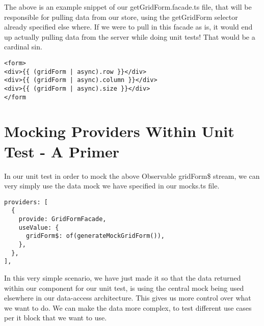 The above is an example snippet of our getGridForm.facade.ts file, that will be responsible for pulling data from our store, using the getGridForm selector already specified else where. If we were to pull in this facade as is, it would end up actually pulling data from the server while doing unit tests! That would be a cardinal sin. 
\begin{verbatim}
<form>
<div>{{ (gridForm | async).row }}</div>
<div>{{ (gridForm | async).column }}</div>
<div>{{ (gridForm | async).size }}</div>
</form
\end{verbatim}

\section{ Mocking Providers Within Unit Test - A Primer }
In our unit test in order to mock the above Observable gridForm\$ stream, we can very simply use the data mock we have specified in our mocks.ts file.
\begin{lstlisting}
providers: [
  {
    provide: GridFormFacade,
    useValue: {
      gridForm$: of(generateMockGridForm()),
    },
  },
],
\end{lstlisting}

In this very simple scenario, we have just made it so that the data returned within our component for our unit test, is using the central mock being used elsewhere in our data-access architecture. This gives us more control over what we want to do. We can make the data more complex, to test different use cases per it block that we want to use.

